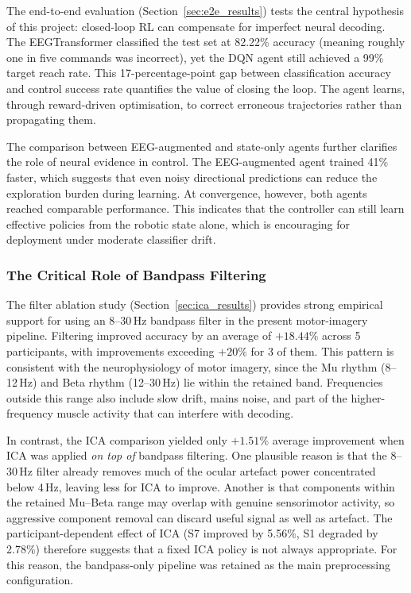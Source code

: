 \documentclass[12pt, a4paper]{article}
\begin{document}
The end-to-end evaluation (Section~\ref{sec:e2e_results}) tests the central hypothesis of this project: closed-loop RL can compensate for imperfect neural decoding. The EEGTransformer classified the test set at 82.22\% accuracy (meaning roughly one in five commands was incorrect), yet the DQN agent still achieved a 99\% target reach rate. This 17-percentage-point gap between classification accuracy and control success rate quantifies the value of closing the loop. The agent learns, through reward-driven optimisation, to correct erroneous trajectories rather than propagating them.

The comparison between EEG-augmented and state-only agents further clarifies the role of neural evidence in control. The EEG-augmented agent trained 41\% faster, which suggests that even noisy directional predictions can reduce the exploration burden during learning. At convergence, however, both agents reached comparable performance. This indicates that the controller can still learn effective policies from the robotic state alone, which is encouraging for deployment under moderate classifier drift.

\subsubsection{The Critical Role of Bandpass Filtering}

The filter ablation study (Section~\ref{sec:ica_results}) provides strong empirical support for using an 8--30\,Hz bandpass filter in the present motor-imagery pipeline. Filtering improved accuracy by an average of $+18.44\%$ across 5 participants, with improvements exceeding $+20\%$ for 3 of them. This pattern is consistent with the neurophysiology of motor imagery, since the Mu rhythm (8--12\,Hz) and Beta rhythm (12--30\,Hz) lie within the retained band. Frequencies outside this range also include slow drift, mains noise, and part of the higher-frequency muscle activity that can interfere with decoding.

In contrast, the ICA comparison yielded only $+1.51\%$ average improvement when ICA was applied \emph{on top of} bandpass filtering. One plausible reason is that the 8--30\,Hz filter already removes much of the ocular artefact power concentrated below 4\,Hz, leaving less for ICA to improve. Another is that components within the retained Mu--Beta range may overlap with genuine sensorimotor activity, so aggressive component removal can discard useful signal as well as artefact. The participant-dependent effect of ICA (S7 improved by 5.56\%, S1 degraded by 2.78\%) therefore suggests that a fixed ICA policy is not always appropriate. For this reason, the bandpass-only pipeline was retained as the main preprocessing configuration.
\end{document}
